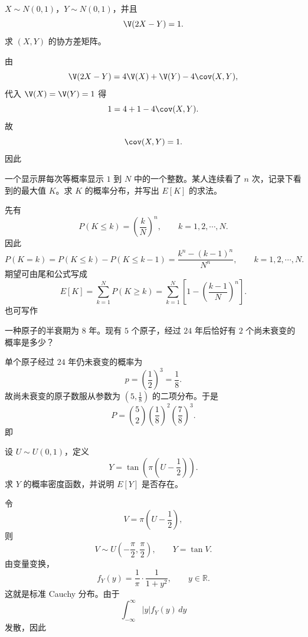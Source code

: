 ﻿

\begin{question}
$X\sim N(0,1)$，$Y\sim N(0,1)$，并且
\[
\V(2X-Y)=1.
\]
求 $(X,Y)$ 的协方差矩阵。
\begin{solution}
由
\[
\V(2X-Y)=4\V(X)+\V(Y)-4\cov(X,Y),
\]
代入 $\V(X)=\V(Y)=1$ 得
\[
1=4+1-4\cov(X,Y).
\]
故
\[
\cov(X,Y)=1.
\]
因此
\end{solution}
\end{question}

\begin{question}
一个显示屏每次等概率显示 $1$ 到 $N$ 中的一个整数。某人连续看了 $n$ 次，记录下看到的最大值 $K$。求 $K$ 的概率分布，并写出 $E[K]$ 的求法。
\begin{solution}
先有
\[
P(K\le k)=\left(\frac{k}{N}\right)^n,\qquad k=1,2,\cdots,N.
\]
因此
\[
P(K=k)=P(K\le k)-P(K\le k-1)
=\frac{k^n-(k-1)^n}{N^n},\qquad k=1,2,\cdots,N.
\]
期望可由尾和公式写成
\[
E[K]=\sum_{k=1}^{N}P(K\ge k)
=\sum_{k=1}^{N}\left[1-\left(\frac{k-1}{N}\right)^n\right].
\]
也可写作
\end{solution}
\end{question}

\begin{question}
一种原子的半衰期为 $8$ 年。现有 $5$ 个原子，经过 $24$ 年后恰好有 $2$ 个尚未衰变的概率是多少？
\begin{solution}
单个原子经过 $24$ 年仍未衰变的概率为
\[
p=\left(\frac12\right)^3=\frac18.
\]
故尚未衰变的原子数服从参数为 $(5,\frac18)$ 的二项分布。于是
\[
P=\binom52\left(\frac18\right)^2\left(\frac78\right)^3.
\]
即
\end{solution}
\end{question}

\begin{question}
设 $U\sim U(0,1)$，定义
\[
Y=\tan\!\left(\pi\left(U-\frac12\right)\right).
\]
求 $Y$ 的概率密度函数，并说明 $E[Y]$ 是否存在。
\begin{solution}
令
\[
V=\pi\left(U-\frac12\right),
\]
则
\[
V\sim U\!\left(-\frac{\pi}{2},\frac{\pi}{2}\right),\qquad Y=\tan V.
\]
由变量变换，
\[
f_Y(y)=\frac{1}{\pi}\cdot \frac{1}{1+y^2},\qquad y\in \mathbb R.
\]
这就是标准 Cauchy 分布。由于
\[
\int_{-\infty}^{\infty}|y|f_Y(y)\,dy
\]
发散，因此
\end{solution}
\end{question}

